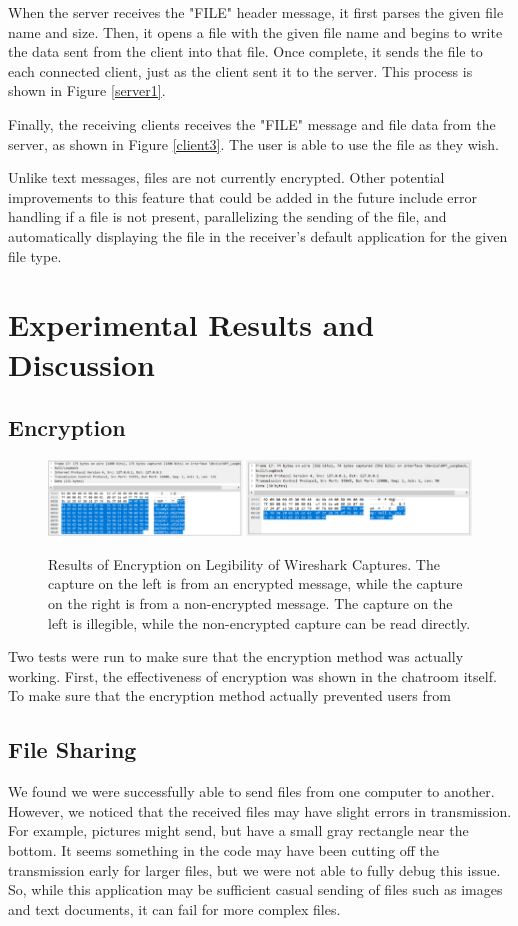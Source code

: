 \documentclass{article}
\begin{document}
When the server receives the "FILE" header message, it first parses the given file name and size. Then, it opens a file with the given file name and begins to write the data sent from the client into that file. Once complete, it sends the file to each connected client, just as the client sent it to the server. This process is shown in Figure \ref{server1}.

Finally, the receiving clients receives the "FILE" message and file data from the server, as shown in Figure \ref{client3}. The user is able to use the file as they wish.

Unlike text messages, files are not currently encrypted. Other potential improvements to this feature that could be added in the future include error handling if a file is not present, parallelizing the sending of the file, and automatically displaying the file in the receiver's default application for the given file type.

\section{Experimental Results and Discussion}

\subsection{Encryption}

\begin{figure}[h]
\centering
\includegraphics[width=1\textwidth]{media/WiresharkEncryptionResults.PNG}
\label{Encryption Wireshark Results}
\caption{Results of Encryption on Legibility of Wireshark Captures. The capture on the left is from an encrypted message, while the capture on the right is from a non-encrypted message. The capture on the left is illegible, while the non-encrypted capture can be read directly.}
\end{figure}

Two tests were run to make sure that the encryption method was actually working. First, the effectiveness of encryption was shown in the chatroom itself. To make sure that the encryption method actually prevented users from

\subsection{File Sharing}
We found we were successfully able to send files from one computer to another. However, we noticed that the received files may have slight errors in transmission. For example, pictures might send, but have a small gray rectangle near the bottom. It seems something in the code may have been cutting off the transmission early for larger files, but we were not able to fully debug this issue. So, while this application may be sufficient casual sending of files such as images and text documents, it can fail for more complex files.
\end{document}
